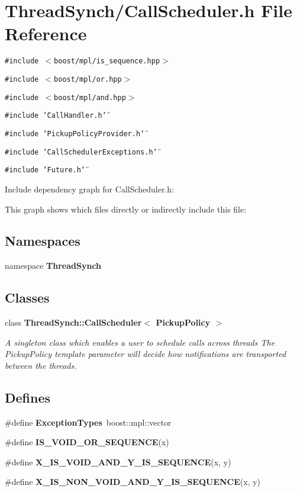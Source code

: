 \section{Thread\-Synch/Call\-Scheduler.h File Reference}
\label{_call_scheduler_8h}
{\tt \#include $<$boost/mpl/is\_\-sequence.hpp$>$}\par
{\tt \#include $<$boost/mpl/or.hpp$>$}\par
{\tt \#include $<$boost/mpl/and.hpp$>$}\par
{\tt \#include \char`\"{}Call\-Handler.h\char`\"{}}\par
{\tt \#include \char`\"{}Pickup\-Policy\-Provider.h\char`\"{}}\par
{\tt \#include \char`\"{}Call\-Scheduler\-Exceptions.h\char`\"{}}\par
{\tt \#include \char`\"{}Future.h\char`\"{}}\par


Include dependency graph for Call\-Scheduler.h:

This graph shows which files directly or indirectly include this file:\subsection*{Namespaces}
\begin{CompactItemize}
\item 
namespace {\bf Thread\-Synch}
\end{CompactItemize}
\subsection*{Classes}
\begin{CompactItemize}
\item 
class {\bf Thread\-Synch::Call\-Scheduler$<$ Pickup\-Policy $>$}
\begin{CompactList}\small\item\em A singleton class which enables a user to schedule calls across threads The Pickup\-Policy template parameter will decide how notifications are transported between the threads. \item\end{CompactList}\end{CompactItemize}
\subsection*{Defines}
\begin{CompactItemize}
\item 
\#define {\bf Exception\-Types}~boost::mpl::vector
\item 
\#define {\bf IS\_\-VOID\_\-OR\_\-SEQUENCE}(x)
\item 
\#define {\bf X\_\-IS\_\-VOID\_\-AND\_\-Y\_\-IS\_\-SEQUENCE}(x, y)
\item 
\#define {\bf X\_\-IS\_\-NON\_\-VOID\_\-AND\_\-Y\_\-IS\_\-SEQUENCE}(x, y)
\end{CompactItemize}
